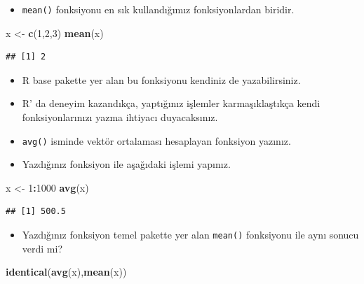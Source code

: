 \documentclass[
  oneside]{book}
\newenvironment{Shaded}{\begin{snugshade}}{\end{snugshade}}
\newcommand{\DecValTok}[1]{\textcolor[rgb]{0.00,0.00,0.81}{#1}}
\newcommand{\FunctionTok}[1]{\textcolor[rgb]{0.13,0.29,0.53}{\textbf{#1}}}
\newcommand{\NormalTok}[1]{#1}
\newcommand{\OtherTok}[1]{\textcolor[rgb]{0.56,0.35,0.01}{#1}}
\newcommand{\SpecialCharTok}[1]{\textcolor[rgb]{0.81,0.36,0.00}{\textbf{#1}}}
\providecommand{\tightlist}{%
  \setlength{\itemsep}{0pt}\setlength{\parskip}{0pt}}
\begin{document}
\begin{itemize}
\tightlist
\item
  \texttt{mean()} fonksiyonu en sık kullandığımız fonksiyonlardan biridir.
\end{itemize}

\begin{Shaded}
\begin{Highlighting}[]
\NormalTok{x }\OtherTok{\textless{}{-}}  \FunctionTok{c}\NormalTok{(}\DecValTok{1}\NormalTok{,}\DecValTok{2}\NormalTok{,}\DecValTok{3}\NormalTok{)}
\FunctionTok{mean}\NormalTok{(x)}
\end{Highlighting}
\end{Shaded}

\begin{verbatim}
## [1] 2
\end{verbatim}

\begin{itemize}
\item
  R base pakette yer alan bu fonksiyonu kendiniz de yazabilirsiniz.
\item
  R' da deneyim kazandıkça, yaptığınız işlemler karmaşıklaştıkça
  kendi fonksiyonlarınızı yazma ihtiyacı duyacaksınız.
\item
  \texttt{avg()} isminde vektör ortalaması hesaplayan fonksiyon yazınız.
\item
  Yazdığınız fonksiyon ile aşağıdaki işlemi yapınız.
\end{itemize}

\begin{Shaded}
\begin{Highlighting}[]
\NormalTok{x }\OtherTok{\textless{}{-}}  \DecValTok{1}\SpecialCharTok{:}\DecValTok{1000}
\FunctionTok{avg}\NormalTok{(x)}
\end{Highlighting}
\end{Shaded}

\begin{verbatim}
## [1] 500.5
\end{verbatim}

\begin{itemize}
\tightlist
\item
  Yazdığınız fonksiyon temel pakette yer alan \texttt{mean()} fonksiyonu ile aynı sonucu verdi mi?
\end{itemize}

\begin{Shaded}
\begin{Highlighting}[]
\FunctionTok{identical}\NormalTok{(}\FunctionTok{avg}\NormalTok{(x),}\FunctionTok{mean}\NormalTok{(x))}
\end{Highlighting}
\end{Shaded}
\end{document}
